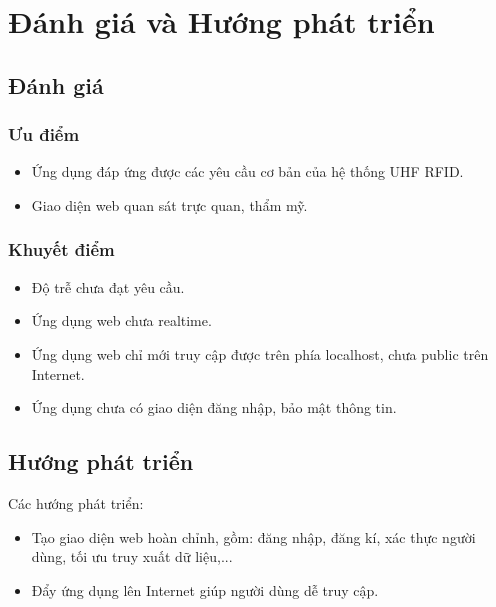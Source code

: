\headerandfooterconfig

\chapter{Đánh giá và Hướng phát triển}
\section{Đánh giá}
\subsection{Ưu điểm}
\begin{itemize}
	\item Ứng dụng đáp ứng được các yêu cầu cơ bản của hệ thống UHF RFID.
	\item Giao diện web quan sát trực quan, thẩm mỹ.
\end{itemize}
\subsection{Khuyết điểm}
\begin{itemize}
	\item Độ trễ chưa đạt yêu cầu.
	\item Ứng dụng web chưa realtime.
	\item Ứng dụng web chỉ mới truy cập được trên phía localhost, chưa public trên Internet.
	\item Ứng dụng chưa có giao diện đăng nhập, bảo mật thông tin.
\end{itemize}
\section{Hướng phát triển}
Các hướng phát triển:
\begin{itemize}
	\item Tạo giao diện web hoàn chỉnh, gồm: đăng nhập, đăng kí, xác thực người dùng, tối ưu truy xuất dữ liệu,...
	\item Đẩy ứng dụng lên Internet giúp người dùng dễ truy cập.
\end{itemize}